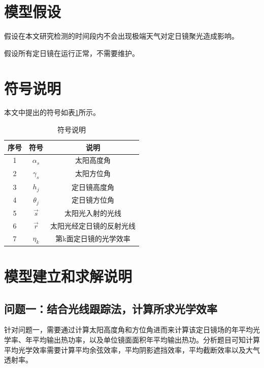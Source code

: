 \documentclass[withoutpreface,bwprint]{cumcmthesis} %
\begin{document}
\section{模型假设}

\begin{assumption}
    假设在本文研究检测的时间段内不会出现极端天气对定日镜聚光造成影响。
\end{assumption}

\begin{assumption}
    假设所有定日镜在运行正常，不需要维护。
\end{assumption}


\section{符号说明}

本文中提出的符号如表\ref{tab:notation}所示。

\begin{table}[hptb]
    \centering
    \caption{符号说明}
    \label{tab:notation}
    \begin{tabular}{@{}ccc@{}}
        \toprule
        序号 & 符号           & 说明           \\ \midrule
        1  & $\alpha_{s}$ & 太阳高度角        \\
        2  & $\gamma_{s}$ & 太阳方位角        \\
        3  & $h_{j}$      & 定日镜高度角       \\
        4  & $\theta_{j}$ & 定日镜方位角       \\
        5  & $\vec{s}$    & 太阳光入射的光线     \\
        6  & $\vec{r}$    & 太阳光经定日镜的反射光线 \\
        7  & $\eta_{k}$   & 第k面定日镜的光学效率  \\ \bottomrule
    \end{tabular}
\end{table}

\section{模型建立和求解说明}

\subsection{问题一：结合光线跟踪法，计算所求光学效率}

针对问题一，需要通过计算太阳高度角和方位角进而来计算该定日镜场的年平均光学率、年平均输出热功率，以及单位镜面面积年平均输出热功。分析题目可知计算平均光学效率需要计算平均余弦效率，平均阴影遮挡效率，平均截断效率以及大气透射率。
\end{document}
